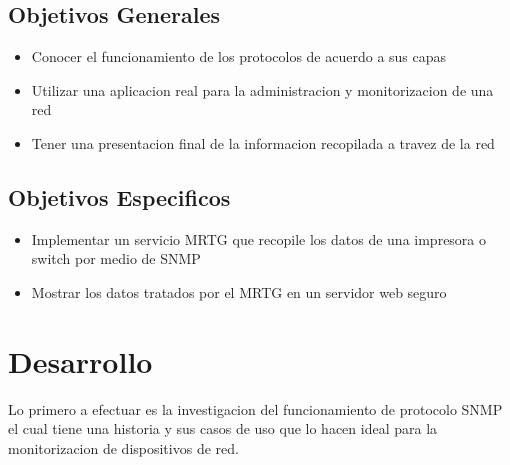 \documentclass[letterpaper]{article}
\begin{document}
\subsection{Objetivos Generales}\label{sec:objgen}
\begin{itemize}
\item Conocer el funcionamiento de los protocolos de acuerdo a sus capas
\item Utilizar una aplicacion real para la administracion y monitorizacion de una red
\item Tener una presentacion final de la informacion recopilada a travez de la red
\end{itemize}
\subsection{Objetivos Especificos}\label{sec:objgen}
\begin{itemize}
\item Implementar un servicio MRTG que recopile los datos de una impresora o switch por medio de SNMP
\item Mostrar los datos tratados por el MRTG en un servidor web seguro
\end{itemize}
\section{Desarrollo}\label{sec:objgen}
Lo primero a efectuar es la investigacion del funcionamiento de protocolo SNMP el cual tiene una historia
y sus casos de uso que lo hacen ideal para la monitorizacion de dispositivos de red.
\end{document}
